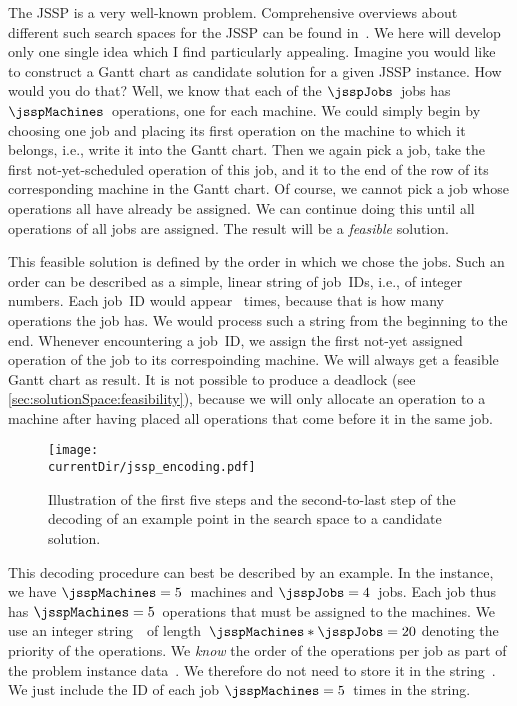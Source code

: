 The \gls{JSSP} is a very well-known problem.
Comprehensive overviews about different such search spaces for the \gls{JSSP} can be found in~\cite{CGT1996ATSOJSSPUGAIR,W2013GAFSSPAS,A2010RIGAFTJSPACS,YN1997GAFJSSP}.
We here will develop only one single idea which I find particularly appealing.%
%
%
%
Imagine you would like to construct a Gantt chart as candidate solution for a given \gls{JSSP} instance.
How would you do that?
Well, we know that each of the $\jsspJobs$~jobs has $\jsspMachines$~operations, one for each machine.
We could simply begin by choosing one job and placing its first operation on the machine to which it belongs, i.e., write it into the Gantt chart.
Then we again pick a job, take the first not-yet-scheduled operation of this job, and  it to the end of the row of its corresponding machine in the Gantt chart.
Of course, we cannot pick a job whose operations all have already be assigned.
We can continue doing this until all operations of all jobs are assigned.
The result will be a \emph{feasible} solution.

This feasible solution is defined by the order in which we chose the jobs.
Such an order can be described as a simple, linear string of job~IDs, i.e., of integer numbers.
Each job~ID would appear \jsspMachines~times, because that is how many operations the job has.
We would process such a string from the beginning to the end.
Whenever encountering a job~ID, we assign the first not-yet assigned operation of the job to its correspoinding machine.
We will always get a feasible Gantt chart as result.
It is not possible to produce a deadlock (see \autoref{sec:solutionSpace:feasibility}), because we will only allocate an operation to a machine after having placed all operations that come before it in the same job.

\begin{figure}%
\centering%
\texttt{[image: \\currentDir/jssp\_encoding.pdf]}%
\caption{Illustration of the first five steps and the second-to-last step of the decoding of an example point in the search space to a candidate solution.}%
\label{fig:jssp_encoding}%
\end{figure}

This decoding procedure can best be described by an example.
In the  instance, we have $\jsspMachines=5$~machines and $\jsspJobs=4$~jobs.
Each job thus has $\jsspMachines=5$~operations that must be assigned to the machines.
We use an integer string~\sespel\ of length~$\jsspMachines*\jsspJobs=20$ denoting the priority of the operations.
We \emph{know} the order of the operations per job as part of the problem instance data~\instance.
We therefore do not need to store it in the string~\sespel.
We just include the ID of each job $\jsspMachines=5$~times in the string.

